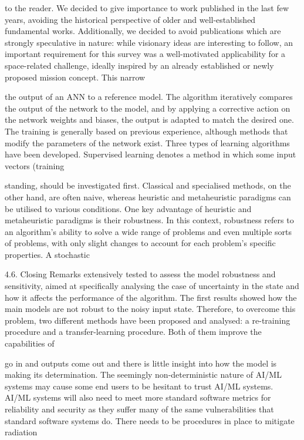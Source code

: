 \documentclass[a4paper,12pt]{article}
\begin{document}
to the reader. We decided to give importance to work published in the last few years,
avoiding the historical perspective of older and well-established fundamental works.
Additionally, we decided to avoid publications which are strongly speculative in
nature: while visionary ideas are interesting to follow, an important requirement for
this survey was a well-motivated applicability for a space-related challenge, ideally
inspired by an already established or newly proposed mission concept. This narrow

the output of an ANN to a reference model. The algorithm iteratively compares the 
output of the network to the model, and by applying a corrective action on the 
network weights and biases, the output is adapted to match the desired one. The 
training is generally based on previous experience, although methods that modify 
the parameters of the network exist. Three types of learning algorithms have been 
developed. 
Supervised learning denotes a method in which some input vectors (training

standing, should be investigated first. Classical and specialised methods, 
on the other hand, are often naive, whereas heuristic and metaheuristic 
paradigms can be utilised to various conditions. One key advantage of 
heuristic and metaheuristic paradigms is their robustness. In this 
context, robustness refers to an algorithm’s ability to solve a wide range 
of problems and even multiple sorts of problems, with only slight 
changes to account for each problem’s specific properties. A stochastic

4.6.
Closing Remarks
extensively tested to assess the model robustness and sensitivity, aimed at
specifically analysing the case of uncertainty in the state and how it affects the
performance of the algorithm. The first results showed how the main models are
not robust to the noisy input state. Therefore, to overcome this problem, two
different methods have been proposed and analysed: a re-training procedure
and a transfer-learning procedure. Both of them improve the capabilities of

go in and outputs come out and there is little insight into how the model is making its determination. The seemingly
non-deterministic nature of AI/ML systems may cause some end users to be hesitant to trust AI/ML systems. AI/ML
systems will also need to meet more standard software metrics for reliability and security as they suﬀer many of the
same vulnerabilities that standard software systems do. There needs to be procedures in place to mitigate radiation
\end{document}

